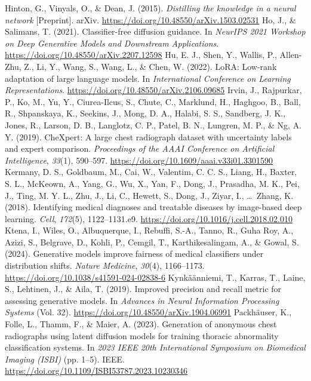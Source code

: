 \documentclass[11pt,a4paper]{article}
\begin{document}
\begin{thebibliography}{}
 Hinton, G., Vinyals, O., \& Dean, J. (2015). \textit{Distilling the knowledge in a neural network} [Preprint]. arXiv. \url{https://doi.org/10.48550/arXiv.1503.02531}
 Ho, J., \& Salimans, T. (2021). Classifier-free diffusion guidance. In \textit{NeurIPS 2021 Workshop on Deep Generative Models and Downstream Applications}. \url{https://doi.org/10.48550/arXiv.2207.12598}
 Hu, E. J., Shen, Y., Wallis, P., Allen-Zhu, Z., Li, Y., Wang, S., Wang, L., \& Chen, W. (2022). LoRA: Low-rank adaptation of large language models. In \textit{International Conference on Learning Representations}. \url{https://doi.org/10.48550/arXiv.2106.09685}
 Irvin, J., Rajpurkar, P., Ko, M., Yu, Y., Ciurea-Ilcus, S., Chute, C., Marklund, H., Haghgoo, B., Ball, R., Shpanskaya, K., Seekins, J., Mong, D. A., Halabi, S. S., Sandberg, J. K., Jones, R., Larson, D. B., Langlotz, C. P., Patel, B. N., Lungren, M. P., \& Ng, A. Y. (2019). CheXpert: A large chest radiograph dataset with uncertainty labels and expert comparison. \textit{Proceedings of the AAAI Conference on Artificial Intelligence}, \textit{33}(1), 590--597. \url{https://doi.org/10.1609/aaai.v33i01.3301590}
 Kermany, D. S., Goldbaum, M., Cai, W., Valentim, C. C. S., Liang, H., Baxter, S. L., McKeown, A., Yang, G., Wu, X., Yan, F., Dong, J., Prasadha, M. K., Pei, J., Ting, M. Y. L., Zhu, J., Li, C., Hewett, S., Dong, J., Ziyar, I., \ldots\ Zhang, K. (2018). Identifying medical diagnoses and treatable diseases by image-based deep learning. \textit{Cell}, \textit{172}(5), 1122--1131.e9. \url{https://doi.org/10.1016/j.cell.2018.02.010}
 Ktena, I., Wiles, O., Albuquerque, I., Rebuffi, S.-A., Tanno, R., Guha Roy, A., Azizi, S., Belgrave, D., Kohli, P., Cemgil, T., Karthikesalingam, A., \& Gowal, S. (2024). Generative models improve fairness of medical classifiers under distribution shifts. \textit{Nature Medicine}, \textit{30}(4), 1166--1173. \url{https://doi.org/10.1038/s41591-024-02838-6}
 Kynk\"a\"anniemi, T., Karras, T., Laine, S., Lehtinen, J., \& Aila, T. (2019). Improved precision and recall metric for assessing generative models. In \textit{Advances in Neural Information Processing Systems} (Vol. 32). \url{https://doi.org/10.48550/arXiv.1904.06991}
 Packh\"auser, K., Folle, L., Thamm, F., \& Maier, A. (2023). Generation of anonymous chest radiographs using latent diffusion models for training thoracic abnormality classification systems. In \textit{2023 IEEE 20th International Symposium on Biomedical Imaging (ISBI)} (pp. 1--5). IEEE. \url{https://doi.org/10.1109/ISBI53787.2023.10230346}

\end{thebibliography}
\end{document}
